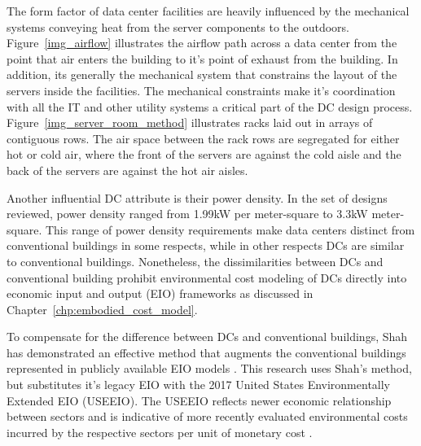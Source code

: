         The form factor of data center facilities are heavily influenced by the mechanical systems conveying heat from the server components to the outdoors. Figure~\ref{img_airflow} illustrates the airflow path across a data center from the point that air enters the building to it's point of exhaust from the building. In addition, its generally the mechanical system that constrains the layout of the servers inside the facilities. The mechanical constraints make it's coordination with all the IT and other utility systems a critical part of the DC design process. Figure~\ref{img_server_room_method} illustrates racks laid out in arrays of contiguous rows. The air space between the rack rows are segregated for either hot or cold air, where the front of the servers are against the cold aisle and the back of the servers are against the hot air aisles. 
        
        
        
    
        
        Another influential DC attribute is their power density. In the set of designs reviewed, power density ranged from 1.99kW per meter-square to 3.3kW meter-square. This range of power density requirements make data centers distinct from conventional buildings in some respects, while in other respects DCs are similar to conventional buildings. Nonetheless, the dissimilarities between DCs and conventional building prohibit environmental cost modeling of DCs directly into economic input and output (EIO) frameworks as discussed in Chapter~\ref{chp:embodied_cost_model}.
        
        To compensate for the difference between DCs and conventional buildings, Shah has demonstrated an effective method that augments the conventional buildings represented in publicly available EIO models \cite{shah11}. This research uses Shah's method, but substitutes it's legacy EIO with the 2017 United States Environmentally Extended EIO (USEEIO). The USEEIO reflects newer economic relationship between sectors and is indicative of more recently evaluated environmental costs incurred by the respective sectors per unit of monetary cost \cite{yang17}. 
        
